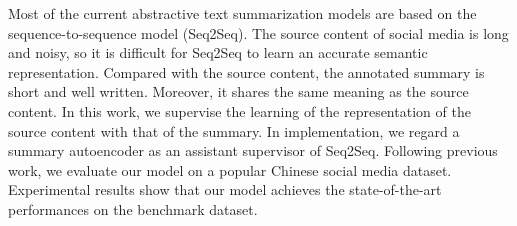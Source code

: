 Most of the current abstractive text summarization models are based on the sequence-to-sequence model (Seq2Seq). The source content of social media is long and noisy, so it is difficult for Seq2Seq to learn an accurate semantic representation. Compared with the source content, the annotated summary is short and well written. Moreover, it shares the same meaning as the source content. In this work, we supervise the learning of the representation of the source content with that of the summary. In implementation, we regard a summary autoencoder as an assistant supervisor of Seq2Seq. Following previous work, we evaluate our model on a popular Chinese social media dataset. Experimental results show that our model achieves the state-of-the-art performances on the benchmark dataset.
